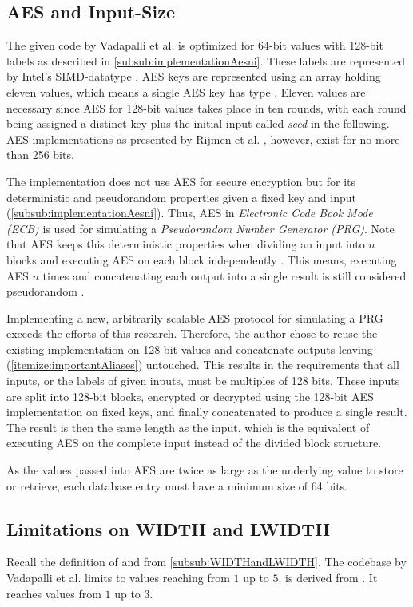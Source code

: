 \label{sec:GeneralLimitations}
\subsection{AES and Input-Size}\label{sub:AESSizeLimitations}
The given code by Vadapalli et al. \cite{vadapalli2023duoram} is optimized for 64-bit values with 128-bit labels as described in \ref{subsub:implementationAesni}.
These labels are represented by Intel's SIMD-datatype .
AES keys are represented using an array holding eleven  values, which means a single AES key has type .
Eleven values are necessary since AES for 128-bit values takes place in ten rounds, with each round being assigned a distinct key plus the initial input called \textit{seed} in the following.
AES implementations as presented by Rijmen et al. \cite{rijmen2001advanced}, however, exist for no more than 256 bits.

The implementation does not use AES for secure encryption but for its deterministic and pseudorandom properties given a fixed key and input (\ref{subsub:implementationAesni}).
Thus, AES in \textit{Electronic Code Book Mode (ECB)} is used for simulating a \textit{Pseudorandom Number Generator (PRG)}.
Note that AES keeps this deterministic properties when dividing an input into $n$ blocks and executing AES on each block independently \cite{gentry2012homomorphic}.
This means, executing AES $n$ times and concatenating each output into a single result is still considered pseudorandom \cite{gentry2012homomorphic}.

Implementing a new, arbitrarily scalable AES protocol for simulating a PRG exceeds the efforts of this research.
Therefore, the author chose to reuse the existing implementation on 128-bit values and concatenate outputs leaving  (\ref{itemize:importantAliases}) untouched.
This results in the requirements that all inputs, or the labels of given inputs, must be multiples of 128 bits.
These inputs are split into 128-bit blocks, encrypted or decrypted using the 128-bit AES implementation on fixed keys, and finally concatenated to produce a single result.
The result is then the same length as the input, which is the equivalent of executing AES on the complete input instead of the divided block structure.

As the values passed into AES are twice as large as the underlying value to store or retrieve, each database entry must have a minimum size of 64 bits.

\subsection{Limitations on WIDTH and LWIDTH}\label{sub:LimitWIDTHandLWIDTH}
Recall the definition of  and  from \ref{subsub:WIDTHandLWIDTH}.
The codebase by Vadapalli et al. limits  to values reaching from $1$ up to $5$.
 is derived from .
It reaches values from $1$ up to $3$.

